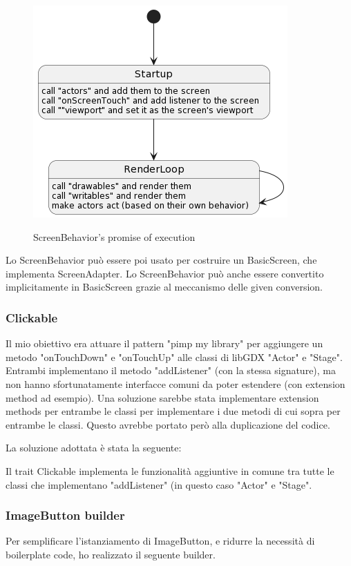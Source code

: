 

\begin{figure}[H]
    \centering
    \caption{ScreenBehavior's promise of execution}
    \includegraphics[width=0.8\linewidth]{images/screen-behavior.png}
    \label{ScreenBehavior}
\end{figure}


Lo ScreenBehavior può essere poi usato per costruire un BasicScreen, che implementa ScreenAdapter. Lo ScreenBehavior può anche essere convertito implicitamente in BasicScreen grazie al meccanismo delle given conversion.


\subsubsection{Clickable}
Il mio obiettivo era attuare il pattern "pimp my library" per aggiungere un metodo "onTouchDown" e "onTouchUp" alle classi di libGDX "Actor" e "Stage".
Entrambi implementano il metodo "addListener" (con la stessa signature), ma non hanno sfortunatamente interfacce comuni da poter estendere (con extension method ad esempio).
Una soluzione sarebbe stata implementare extension methods per entrambe le classi per implementare i due metodi di cui sopra per entrambe le classi. Questo avrebbe portato però alla duplicazione del codice.

La soluzione adottata è stata la seguente:



Il trait Clickable implementa le funzionalità aggiuntive in comune tra tutte le classi che implementano "addListener" (in questo caso "Actor" e "Stage".

\subsubsection{ImageButton builder}
Per semplificare l'istanziamento di ImageButton, e ridurre la necessità di boilerplate code, ho realizzato il seguente builder.

